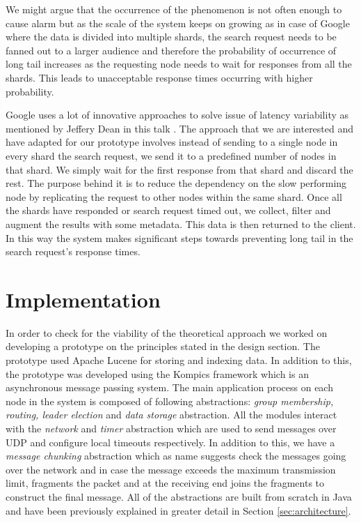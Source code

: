 \documentclass[12pt,a4paper,twoside,openright]{book}
\begin{document}
\par We might argue that the occurrence of the phenomenon is not often enough to cause alarm but as the scale of the system keeps on growing as in case of Google where the data is divided into multiple shards, the search request needs to be fanned out to a larger audience and therefore the probability of occurrence of long tail increases as the requesting node needs to wait for responses from all the shards. This leads to unacceptable response times occurring with higher probability. 

\par Google uses a lot of innovative approaches to solve issue of latency variability as mentioned by Jeffery Dean in this talk \cite{jeffDean}. The approach that we are interested and have adapted for our prototype involves instead of sending to a single node in every shard the search request, we send it to a predefined number of nodes in that shard. We simply wait for the first response from that shard and discard the rest. The purpose behind it is to reduce the dependency on the slow performing node by replicating the request to other nodes within the same shard. Once all the shards have responded or search request timed out, we collect, filter and augment the results with some metadata. This data is then returned to the client. In this way the system makes significant steps towards preventing long tail in the search request's response times.


\chapter{Implementation}
\label{chap:impl}

In order to check for the viability of the theoretical approach we worked on developing a prototype on the principles stated in the design section. The prototype used Apache Lucene for storing and indexing data. In addition to this, the prototype was developed using the Kompics framework which is an asynchronous message passing system. The main application process on each node in the system is composed of following abstractions: \textit {group membership, routing, leader election} and \textit{data storage} abstraction. All the modules interact with the \textit{network} and \textit{timer} abstraction which are used to send messages over UDP and configure local timeouts respectively. In addition to this, we have a \textit{message chunking} abstraction which as name suggests check the messages going over the network and in case the message exceeds the maximum transmission limit, fragments the packet and at the receiving end joins the fragments to construct the final message. All of the abstractions are built from scratch in Java and have been previously explained in greater detail in Section \ref{sec:architecture}.
\end{document}
